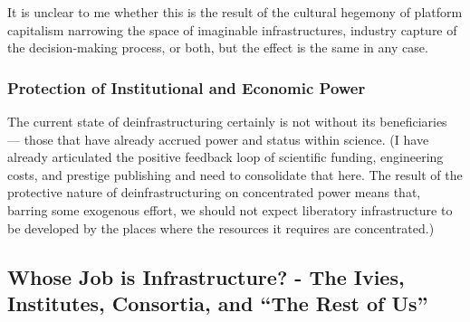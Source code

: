 \documentclass[11pt]{article}
\begin{document}
\begin{multicols}{2}
It is unclear to me whether this is the result of the cultural hegemony
of platform capitalism narrowing the space of imaginable
infrastructures, industry capture of the decision-making process, or
both, but the effect is the same in any case.

\hypertarget{protection-of-institutional-and-economic-power}{%
\subsubsection{Protection of Institutional and Economic
Power}\label{protection-of-institutional-and-economic-power}}

The current state of deinfrastructuring certainly is not without its
beneficiaries --- those that have already accrued power and status
within science. (I have already articulated the positive feedback loop
of scientific funding, engineering costs, and prestige publishing and
need to consolidate that here. The result of the protective nature of
deinfrastructuring on concentrated power means that, barring some
exogenous effort, we should not expect liberatory infrastructure to be
developed by the places where the resources it requires are
concentrated.) 
\end{multicols}


\hypertarget{whose-job-is-infrastructure---the-ivies-institutes-consortia-and-the-rest-of-us}{%
\subsection{Whose Job is Infrastructure? - The Ivies, Institutes,
Consortia, and ``The Rest of
Us''}\label{whose-job-is-infrastructure---the-ivies-institutes-consortia-and-the-rest-of-us}}
\end{document}
